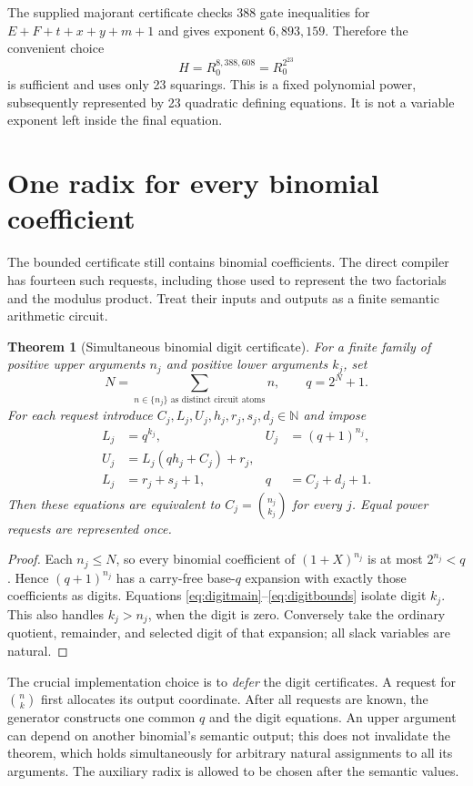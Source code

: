 \documentclass[11pt,letterpaper]{article}
\newtheorem{theorem}{Theorem}[section]
\theoremstyle{definition}\newtheorem{definition}[theorem]{Definition}
\theoremstyle{remark}\newtheorem{remark}[theorem]{Remark}
\newcommand{\N}{\mathbb N}
\begin{document}
The supplied majorant certificate checks 388 gate inequalities for
$E+F+t+x+y+m+1$ and gives exponent $6,893,159$. Therefore the convenient
choice
\begin{equation}\label{eq:majorant}
 \boxed{H=R_0^{8,388,608}=R_0^{2^{23}}}
\end{equation}
is sufficient and uses only 23 squarings. This is a fixed polynomial
power, subsequently represented by 23 quadratic defining equations.
It is not a variable exponent left inside the final equation.

\section{One radix for every binomial coefficient}
\label{sec:radix}

The bounded certificate still contains binomial coefficients. The direct
compiler has fourteen such requests, including those used to represent
the two factorials and the modulus product. Treat their inputs and outputs
as a finite semantic arithmetic circuit.

\begin{theorem}[Simultaneous binomial digit certificate]\label{thm:radix}
For a finite family of positive upper arguments $n_j$ and positive lower
arguments $k_j$, set
\[
 N=\sum_{n\in\{n_j\}\text{ as distinct circuit atoms}} n,
 \qquad q=2^N+1.
\]
For each request introduce $C_j,L_j,U_j,h_j,r_j,s_j,d_j\in\N$ and impose
\begin{align}
 L_j&=q^{k_j},&U_j&=(q+1)^{n_j},\label{eq:digitpowers}\\
 U_j&=L_j(qh_j+C_j)+r_j,\label{eq:digitmain}\\
 L_j&=r_j+s_j+1,&q&=C_j+d_j+1.\label{eq:digitbounds}
\end{align}
Then these equations are equivalent to $C_j=\binom{n_j}{k_j}$ for
every $j$. Equal power requests are represented once.
\end{theorem}
\begin{proof}
Each $n_j\le N$, so every binomial coefficient of $(1+X)^{n_j}$ is
at most $2^{n_j}<q$. Hence $(q+1)^{n_j}$ has a carry-free base-$q$
expansion with exactly those coefficients as digits. Equations
\eqref{eq:digitmain}--\eqref{eq:digitbounds} isolate digit $k_j$.
This also handles $k_j>n_j$, when the digit is zero. Conversely take
the ordinary quotient, remainder, and selected digit of that expansion;
all slack variables are natural.
\end{proof}

The crucial implementation choice is to \emph{defer} the digit certificates.
A request for $\binom nk$ first allocates its output coordinate. After
all requests are known, the generator constructs one common $q$ and the
digit equations. An upper argument can depend on another binomial's
semantic output; this does not invalidate the theorem, which holds
simultaneously for arbitrary natural assignments to all its arguments.
The auxiliary radix is allowed to be chosen after the semantic values.
\end{document}
